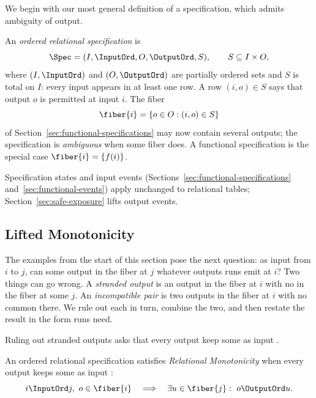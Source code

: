 We begin with our most general definition of a specification, which admits
ambiguity of output.
\begin{definition}
\label{def:relational-specification}
An \emph{ordered relational specification} is
        \begin{equation}
  \Spec=(I,\InputOrd,O,\OutputOrd,S),
  \qquad S\subseteq I\times O,
  \label{eq:relational-specification}
        \end{equation}
where $(I,\InputOrd)$ and $(O,\OutputOrd)$ are partially ordered sets and $S$
is total on $I$: every input appears in at least one row.  A row $(i,o)\in S$
says that output $o$ is permitted at input $i$.  The fiber
        \begin{equation}
  \fiber{i}=\{o\in O:(i,o)\in S\}
  \label{eq:fiber}
        \end{equation}
of Section~\ref{sec:functional-specifications} may now contain several
outputs; the specification is \emph{ambiguous} when some fiber does.  A
functional specification is the special case $\fiber{i}=\{f(i)\}$.
\end{definition}

Specification states and input events
(Sections~\ref{sec:functional-specifications} and~\ref{sec:functional-events})
apply unchanged to relational tables; Section~\ref{sec:safe-exposure} lifts
output events.

\subsection{Lifted Monotonicity}
\label{sec:lifted-monotonicity}

The examples from the start of this section pose the next question: as input
\ingrows from $i$ to $j$, can some output in the fiber at $j$ \outrelbase
whatever outputs runs emit at $i$?  Two things can go wrong.  A
\emph{stranded output} is an output in the fiber at $i$ with no \outnoun in
the fiber at some \indesc $j$.  An \emph{incompatible pair} is two outputs in
the fiber at $i$ with no common \outnoun there.  We rule out
each in turn, combine the two, and then restate the result in the form runs
need.

Ruling out stranded outputs asks that every output keep some \outnoun as
input \ingrows.

\begin{definition}
\label{def:relational-monotonicity}
An ordered relational specification satisfies \emph{Relational Monotonicity}
when every output keeps some \outnoun as input \ingrows:
        \begin{equation}
  i\InputOrd j,\ o\in\fiber{i}
  \quad\Longrightarrow\quad
  \exists u\in\fiber{j}:\ o\OutputOrd u.
  \label{eq:relational-monotonicity}
        \end{equation}
\end{definition}

